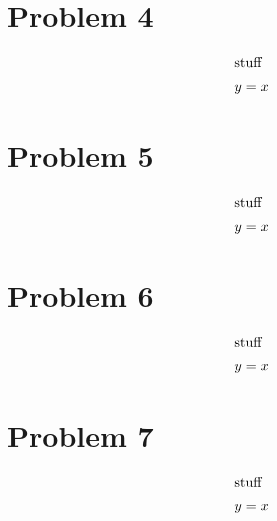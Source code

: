 \documentclass[12pt]{article}
\begin{document}
\newpage
\section*{Problem 4}

\begin{align} 
    \intertext{stuff}
    y&=x
\end{align}



\newpage
\section*{Problem 5}

\begin{align} 
    \intertext{stuff}
    y&=x
\end{align}


\section*{Problem 6}

\begin{align} 
    \intertext{stuff}
    y&=x
\end{align}



\section*{Problem 7}

\begin{align} 
    \intertext{stuff}
    y&=x
\end{align}


\end{document}
